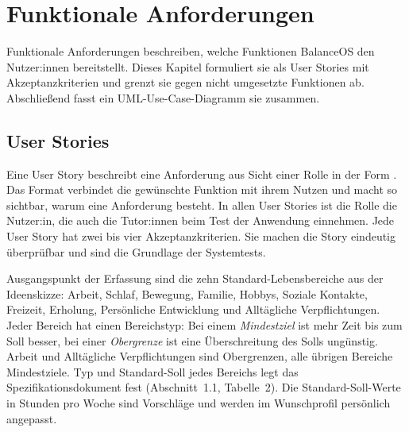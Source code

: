 \section{Funktionale Anforderungen}\label{sec:fa}
Funktionale Anforderungen beschreiben, welche Funktionen BalanceOS den Nutzer:innen bereitstellt. Dieses Kapitel formuliert sie als User Stories mit Akzeptanzkriterien und grenzt sie gegen nicht umgesetzte Funktionen ab. Abschließend fasst ein \ac{UML}-Use-Case-Diagramm sie zusammen.

\subsection{User Stories}\label{sec:userstories}
Eine User Story beschreibt eine Anforderung aus Sicht einer Rolle in der Form  \parencite[S.~1-12]{swebok2026}. Das Format verbindet die gewünschte Funktion mit ihrem Nutzen und macht so sichtbar, warum eine Anforderung besteht. In allen User Stories ist die Rolle die Nutzer:in, die auch die Tutor:innen beim Test der Anwendung einnehmen. Jede User Story hat zwei bis vier Akzeptanzkriterien. Sie machen die Story eindeutig überprüfbar und sind die Grundlage der Systemtests.

Ausgangspunkt der Erfassung sind die zehn Standard-Lebensbereiche aus der Ideenskizze: Arbeit, Schlaf, Bewegung, Familie, Hobbys, Soziale Kontakte, Freizeit, Erholung, Persönliche Entwicklung und Alltägliche Verpflichtungen. Jeder Bereich hat einen Bereichstyp: Bei einem \emph{Mindestziel} ist mehr Zeit bis zum Soll besser, bei einer \emph{Obergrenze} ist eine Überschreitung des Solls ungünstig. Arbeit und Alltägliche Verpflichtungen sind Obergrenzen, alle übrigen Bereiche Mindestziele. Typ und Standard-Soll jedes Bereichs legt das Spezifikationsdokument fest (Abschnitt~1.1, Tabelle~2). Die Standard-Soll-Werte in Stunden pro Woche sind Vorschläge und werden im Wunschprofil persönlich angepasst.

